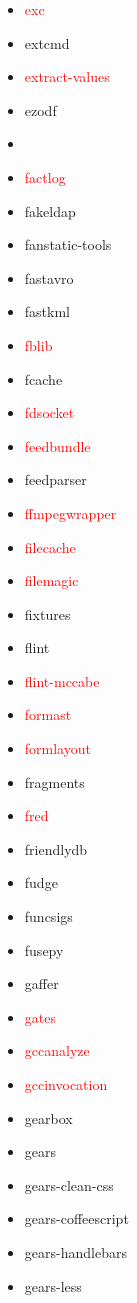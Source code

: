 \documentclass{l4proj}
\begin{document}
\begin{appendices}
{\begin{itemize}
\item\textcolor{red}{exc}
\item extcmd
\item\textcolor{red}{extract-values}
\item ezodf
\item\textcolor{red}{}
\item\textcolor{red}{factlog}
\item fakeldap
\item fanstatic-tools
\item fastavro
\item fastkml
\item\textcolor{red}{fblib}
\item fcache
\item\textcolor{red}{fdsocket}
\item\textcolor{red}{feedbundle}
\item feedparser
\item\textcolor{red}{ffmpegwrapper}
\item\textcolor{red}{filecache}
\item\textcolor{red}{filemagic}
\item fixtures
\item flint
\item\textcolor{red}{flint-mccabe}
\item\textcolor{red}{formast}
\item\textcolor{red}{formlayout}
\item fragments
\end{itemize}
}%
\noindent\parbox[t]{0.32\textwidth}{\raggedright%
\begin{itemize}
\item\textcolor{red}{fred}
\item friendlydb
\item fudge
\item funcsigs
\item fusepy
\item gaffer
\item\textcolor{red}{gates}
\item\textcolor{red}{gccanalyze}
\item\textcolor{red}{gccinvocation}
\item gearbox
\item gears
\item gears-clean-css
\item gears-coffeescript
\item gears-handlebars
\item gears-less

\end{itemize}}
\end{appendices}
\end{document}
